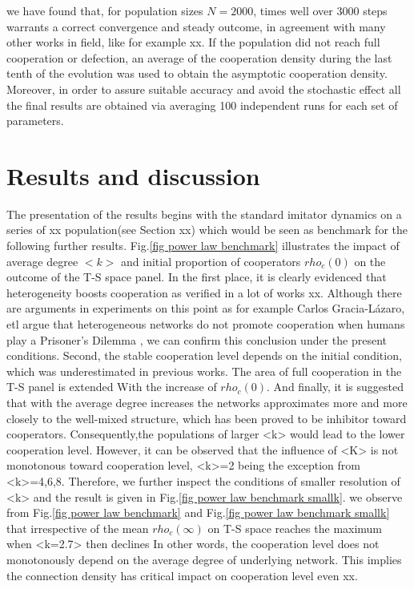 \documentclass[preprint,12pt,3p]{elsarticle}
\begin{document}
we have found that, for population sizes $N=2000$, times well over 3000 steps
warrants a correct convergence and steady outcome, in agreement with many other works in field, like for example xx.
If the population did not reach full cooperation or defection,
an average of the cooperation density during the last tenth of the evolution was used to obtain
the asymptotic cooperation density.
Moreover, in order to assure suitable accuracy and avoid the stochastic effect all the final results are obtained
via averaging 100 independent runs for each set of parameters.


\section{ Results and discussion}

The presentation of the results begins with the standard imitator dynamics
on a series of xx population(see Section xx) which would be seen as benchmark for the following further results.
Fig.\ref{fig power law benchmark} illustrates the impact of average degree $<k>$ and initial proportion of cooperators
 $rho_{c}(0)$ on the outcome of the T-S space panel.
In the first place, it is clearly evidenced that heterogeneity boosts cooperation as verified in a lot of works xx.
Although there are arguments in experiments on this point as for example Carlos Gracia-Lázaro, etl argue that heterogeneous networks do not promote cooperation when humans play a Prisoner’s Dilemma
\cite{Gracia-LázaroFerrer-18206}
, we can confirm this conclusion under the present conditions.
Second, the stable cooperation level depends on the initial condition, which was underestimated in previous works.
The area of full cooperation in the T-S panel is extended With the increase of $rho_{c}(0)$.
And finally, it is suggested that with the average degree increases the networks approximates more and more closely
to the well-mixed structure, which has been proved to be inhibitor toward cooperators.
Consequently,the populations of larger <k> would lead to the lower cooperation level.
However, it can be observed that the influence of <K> is not monotonous toward cooperation level,
<k>=2 being the exception from <k>=4,6,8.
Therefore, we further inspect the conditions of smaller resolution of <k> and the result is given
 in Fig.\ref{fig power law benchmark smallk}.
we observe from Fig.\ref{fig power law benchmark} and Fig.\ref{fig power law benchmark smallk}
that irrespective of  the mean $rho_{c}(\infty)$ on T-S space reaches the maximum when <k=2.7> then declines
In other words, the cooperation level does not monotonously depend on the average degree of underlying network.
This implies the connection density has critical impact on cooperation level even xx.
\end{document}

